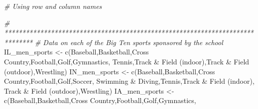 \documentclass[
]{article}
\newenvironment{Shaded}{\begin{snugshade}}{\end{snugshade}}
\newcommand{\CommentTok}[1]{\textcolor[rgb]{0.56,0.35,0.01}{\textit{#1}}}
\newcommand{\FunctionTok}[1]{\textcolor[rgb]{0.00,0.00,0.00}{#1}}
\newcommand{\NormalTok}[1]{#1}
\newcommand{\OtherTok}[1]{\textcolor[rgb]{0.56,0.35,0.01}{#1}}
\newcommand{\StringTok}[1]{\textcolor[rgb]{0.31,0.60,0.02}{#1}}
\begin{document}
\begin{Shaded}
\begin{Highlighting}[]
\CommentTok{\# Using row and column names}

\CommentTok{\# ******************************************************************************}
\CommentTok{\# Data on each of the Big Ten sports sponsored by the school}
\NormalTok{IL\_men\_sports }\OtherTok{\textless{}{-}} \FunctionTok{c}\NormalTok{(}\StringTok{\textquotesingle{}Baseball\textquotesingle{}}\NormalTok{,}\StringTok{\textquotesingle{}Basketball\textquotesingle{}}\NormalTok{,}\StringTok{\textquotesingle{}Cross Country\textquotesingle{}}\NormalTok{,}\StringTok{\textquotesingle{}Football\textquotesingle{}}\NormalTok{,}\StringTok{\textquotesingle{}Golf\textquotesingle{}}\NormalTok{,}\StringTok{\textquotesingle{}Gymnastics\textquotesingle{}}\NormalTok{,}
                   \StringTok{\textquotesingle{}Tennis\textquotesingle{}}\NormalTok{,}\StringTok{\textquotesingle{}Track \& Field (indoor)\textquotesingle{}}\NormalTok{,}\StringTok{\textquotesingle{}Track \& Field (outdoor)\textquotesingle{}}\NormalTok{,}\StringTok{\textquotesingle{}Wrestling\textquotesingle{}}\NormalTok{)}
\NormalTok{IN\_men\_sports }\OtherTok{\textless{}{-}} \FunctionTok{c}\NormalTok{(}\StringTok{\textquotesingle{}Baseball\textquotesingle{}}\NormalTok{,}\StringTok{\textquotesingle{}Basketball\textquotesingle{}}\NormalTok{,}\StringTok{\textquotesingle{}Cross Country\textquotesingle{}}\NormalTok{,}\StringTok{\textquotesingle{}Football\textquotesingle{}}\NormalTok{,}\StringTok{\textquotesingle{}Golf\textquotesingle{}}\NormalTok{,}\StringTok{\textquotesingle{}Soccer\textquotesingle{}}\NormalTok{,}
                   \StringTok{\textquotesingle{}Swimming \& Diving\textquotesingle{}}\NormalTok{,}\StringTok{\textquotesingle{}Tennis\textquotesingle{}}\NormalTok{,}\StringTok{\textquotesingle{}Track \& Field (indoor)\textquotesingle{}}\NormalTok{,}
                   \StringTok{\textquotesingle{}Track \& Field (outdoor)\textquotesingle{}}\NormalTok{,}\StringTok{\textquotesingle{}Wrestling\textquotesingle{}}\NormalTok{)}
\NormalTok{IA\_men\_sports }\OtherTok{\textless{}{-}} \FunctionTok{c}\NormalTok{(}\StringTok{\textquotesingle{}Baseball\textquotesingle{}}\NormalTok{,}\StringTok{\textquotesingle{}Basketball\textquotesingle{}}\NormalTok{,}\StringTok{\textquotesingle{}Cross Country\textquotesingle{}}\NormalTok{,}\StringTok{\textquotesingle{}Football\textquotesingle{}}\NormalTok{,}\StringTok{\textquotesingle{}Golf\textquotesingle{}}\NormalTok{,}\StringTok{\textquotesingle{}Gymnastics\textquotesingle{}}\NormalTok{,}

\end{Highlighting}
\end{Shaded}
\end{document}
